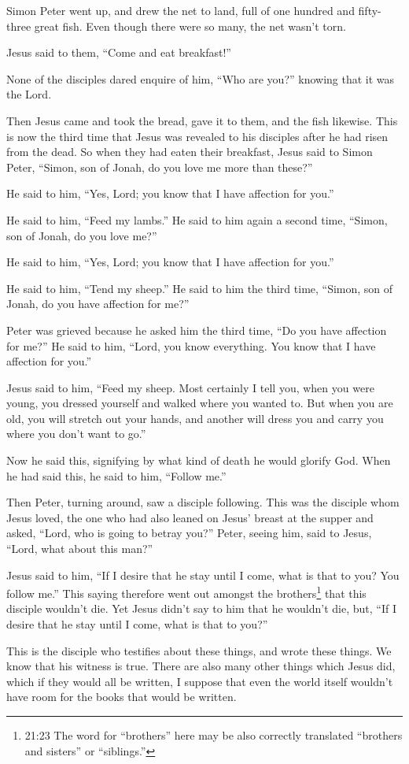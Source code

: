  Simon Peter went up, and drew the net to land, full of one
hundred and fifty-three great fish. Even though there were so many, the
net wasn't torn.

 Jesus said to them, ``Come and eat breakfast!''

None of the disciples dared enquire of him, ``Who are you?'' knowing
that it was the Lord.

 Then Jesus came and took the bread, gave it to them, and
the fish likewise.  This is now the third time that Jesus
was revealed to his disciples after he had risen from the dead.
 So when they had eaten their breakfast, Jesus said to
Simon Peter, ``Simon, son of Jonah, do you love me more than these?''

He said to him, ``Yes, Lord; you know that I have affection for you.''

He said to him, ``Feed my lambs.''  He said to him again a
second time, ``Simon, son of Jonah, do you love me?''

He said to him, ``Yes, Lord; you know that I have affection for you.''

He said to him, ``Tend my sheep.''  He said to him the
third time, ``Simon, son of Jonah, do you have affection for me?''

Peter was grieved because he asked him the third time, ``Do you have
affection for me?'' He said to him, ``Lord, you know everything. You
know that I have affection for you.''

Jesus said to him, ``Feed my sheep.  Most certainly I tell
you, when you were young, you dressed yourself and walked where you
wanted to. But when you are old, you will stretch out your hands, and
another will dress you and carry you where you don't want to go.''

 Now he said this, signifying by what kind of death he
would glorify God. When he had said this, he said to him, ``Follow me.''

 Then Peter, turning around, saw a disciple following. This
was the disciple whom Jesus loved, the one who had also leaned on Jesus'
breast at the supper and asked, ``Lord, who is going to betray you?''
 Peter, seeing him, said to Jesus, ``Lord, what about this
man?''

 Jesus said to him, ``If I desire that he stay until I
come, what is that to you? You follow me.''  This saying
therefore went out amongst the brothers\footnote{21:23 The word for
  ``brothers'' here may be also correctly translated ``brothers and
  sisters'' or ``siblings.''} that this disciple wouldn't die. Yet Jesus
didn't say to him that he wouldn't die, but, ``If I desire that he stay
until I come, what is that to you?''

 This is the disciple who testifies about these things, and
wrote these things. We know that his witness is true. 
There are also many other things which Jesus did, which if they would
all be written, I suppose that even the world itself wouldn't have room
for the books that would be written.
